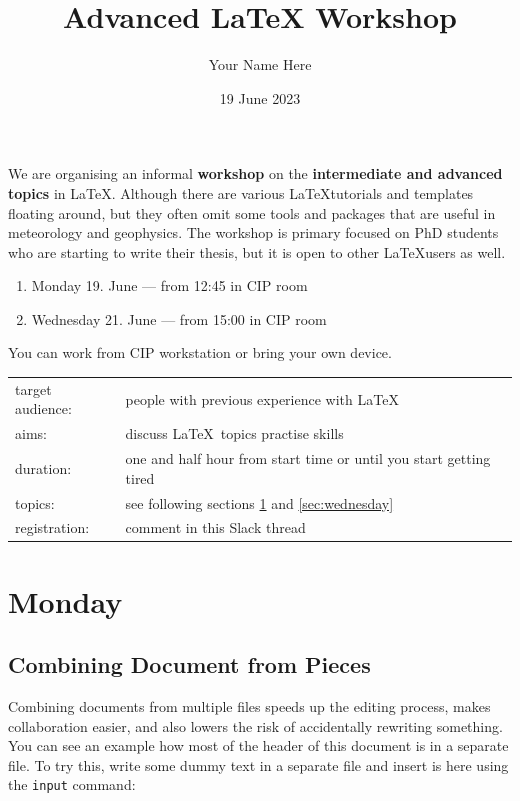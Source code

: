 \documentclass[a4paper,10pt]{report} %
\title{Advanced LaTeX Workshop}
\author{Your Name Here}
\date{19 June 2023}
\begin{document}


 \pagestyle{fancy}
 
 We are organising an informal \textbf{workshop} on the \textbf{intermediate and advanced topics} in \LaTeX.
Although there are various \LaTeX tutorials and templates floating around, but they often omit some tools and packages that are useful in meteorology and geophysics. The workshop is primary focused on PhD students who are starting to write their thesis, but it is open to other \LaTeX users as well.
 \begin{enumerate}
 \item  Monday 19. June --- from 12:45 in CIP room 
 \item  Wednesday 21. June --- from 15:00 in CIP room
\end{enumerate}

\noindent
You can work from CIP workstation or bring your own device.~\\

 \begin{tabular}{l p{}}
   target audience: & people with previous experience with \LaTeX \\
   aims:  & discuss \LaTeX ~topics practise skills \\
   duration: & one and half hour from start time or until you start getting tired \\
   topics: & see following sections \ref{sec:monday} and \ref{sec:wednesday} \\
   registration: & comment in this Slack thread \\ 
 \end{tabular}

 
\section{Monday} \label{sec:monday}

\setcounter{page}{1}


\subsection{Combining Document from Pieces}
Combining documents from multiple files speeds up the editing process, makes collaboration easier, and also lowers the risk of accidentally rewriting something. You can see an example how most of the header of this document is in a separate file.
To try this, write some dummy text in a separate file and insert is here using the \texttt{input} command:\\
% 
\end{document}
